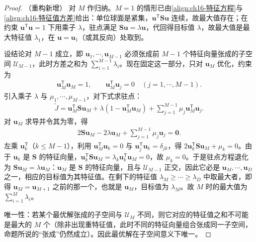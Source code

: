 \documentclass[../../main.tex]{subfiles}
\begin{document}
\begin{proof}（重构新增）
对 $M$ 作归纳。$M=1$ 的情形已由\eqref{align:ch16-特征方程}与\eqref{align:ch16-特征值方差}给出：单位球面是紧集，$\bm{u}^{\mathsf T}\bm{S}\bm{u}$ 连续，故最大值存在；在约束 $\bm{u}^{\mathsf T}\bm{u}=1$ 下用乘子 $\lambda$，驻点满足 $\bm{S}\bm{u}=\lambda\bm{u}$，代回得目标值 $\lambda$，故最大值是最大特征值 $\lambda_1$，在 $\bm{u}=\bm{u}_1$（或其反向）处取到。

设结论对 $M-1$ 成立，即 $\bm{u}_1,\cdots,\bm{u}_{M-1}$ 必须张成前 $M-1$ 个特征向量张成的子空间 $\mathcal{U}_{M-1}$，此时方差之和为 $\sum_{i=1}^{M-1}\lambda_i$。现在固定这一部分，只对 $\bm{u}_M$ 优化，约束为
\begin{align*}
  \bm{u}_M^{\mathsf T}\bm{u}_M=1,\qquad \bm{u}_M^{\mathsf T}\bm{u}_j=0\quad(j=1,\cdots,M-1).
\end{align*}
引入乘子 $\lambda$ 与 $\mu_1,\cdots,\mu_{M-1}$，对下式求驻点：
\begin{align*}
  \tilde{J}=\bm{u}_M^{\mathsf T}\bm{S}\bm{u}_M+\lambda(1-\bm{u}_M^{\mathsf T}\bm{u}_M)+\sum_{j=1}^{M-1}\mu_j\bm{u}_M^{\mathsf T}\bm{u}_j .
\end{align*}
对 $\bm{u}_M$ 求导并令其为零，得
\begin{align*}
  2\bm{S}\bm{u}_M-2\lambda\bm{u}_M+\sum_{j=1}^{M-1}\mu_j\bm{u}_j=\bm{0}.
\end{align*}
左乘 $\bm{u}_k^{\mathsf T}$（$k\leqslant M-1$），利用 $\bm{u}_M^{\mathsf T}\bm{u}_k=0$ 与 $\bm{u}_j^{\mathsf T}\bm{u}_k=\delta_{jk}$，得 $2\bm{u}_k^{\mathsf T}\bm{S}\bm{u}_M+\mu_k=0$。由于 $\bm{u}_k$ 是 $\bm{S}$ 的特征向量，$\bm{u}_k^{\mathsf T}\bm{S}\bm{u}_M=\lambda_k\bm{u}_k^{\mathsf T}\bm{u}_M=0$，故 $\mu_k=0$。于是驻点方程退化为 $\bm{S}\bm{u}_M=\lambda\bm{u}_M$：$\bm{u}_M$ 是 $\bm{S}$ 的特征向量，且与 $\mathcal{U}_{M-1}$ 正交，因此它必是 $\bm{u}_M,\cdots,\bm{u}_D$ 之一，相应的目标值为其特征值。在剩下的特征值 $\lambda_M\geqslant\cdots\geqslant\lambda_D$ 中取最大者，即得 $\bm{u}_M=\bm{u}_{M+1}$ 之前的那一个，也就是 $\bm{u}_M$，目标值为 $\lambda_M$。故 $M$ 时的最大值为 $\sum_{i=1}^{M}\lambda_i$。

唯一性：若某个最优解张成的子空间与 $\mathcal{U}_M$ 不同，则它对应的特征值之和不可能是最大的 $M$ 个（除非出现重特征值，此时不同的特征向量组合张成同一子空间，命题所说的“张成”仍然成立）。因此最优解在子空间意义下唯一。
\end{proof}
\end{document}
